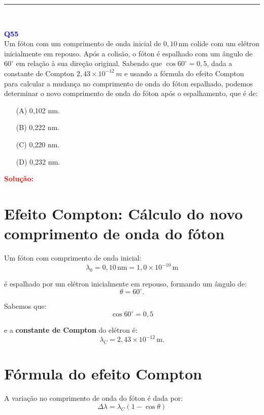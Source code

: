 \documentclass[a4paper,12pt]{article}
\begin{document}
\noindent\rule{\linewidth}{0.6pt}\\

\begin{flushleft}
\textbf{\textcolor{blue}{\Large Q55}}\\
\noindent
Um fóton com um comprimento de onda inicial de \(0,10\,\text{nm}\) colide com um elétron inicialmente em repouso.  
Após a colisão, o fóton é espalhado com um ângulo de \(60^\circ\) em relação à sua direção original.  
Sabendo que \(\cos 60^\circ = 0,5\), dada a constante de Compton \(2,43 \times 10^{-12}\,m\) e usando a fórmula do 
efeito Compton para calcular a mudança no comprimento de onda do fóton espalhado, podemos determinar o novo comprimento 
de onda do fóton após o espalhamento, que é de:


\begin{itemize}
\item[(A)] 0{,}102 nm.
\item[(B)] 0{,}222 nm.
\item[(C)] 0{,}220 nm.
\item[(D)] 0{,}232 nm.
\end{itemize}

\vspace{0.5cm}

\textcolor{red}{\textbf{Solução:}}\\

\section*{Efeito Compton: Cálculo do novo comprimento de onda do fóton}

Um fóton com comprimento de onda inicial:
\[
\lambda_0 = 0{,}10\,\mathrm{nm} = 1{,}0 \times 10^{-10}\,\mathrm{m}
\]

é espalhado por um elétron inicialmente em repouso, formando um ângulo de:
\[
\theta = 60^\circ.
\]

Sabemos que:
\[
\cos 60^\circ = 0{,}5
\]

e a \textbf{constante de Compton} do elétron é:
\[
\lambda_C = 2{,}43 \times 10^{-12}\,\mathrm{m}.
\]

\section*{Fórmula do efeito Compton}

A variação no comprimento de onda do fóton é dada por:
\[
\Delta \lambda = \lambda_C (1 - \cos\theta)
\]


\end{flushleft}
\end{document}

